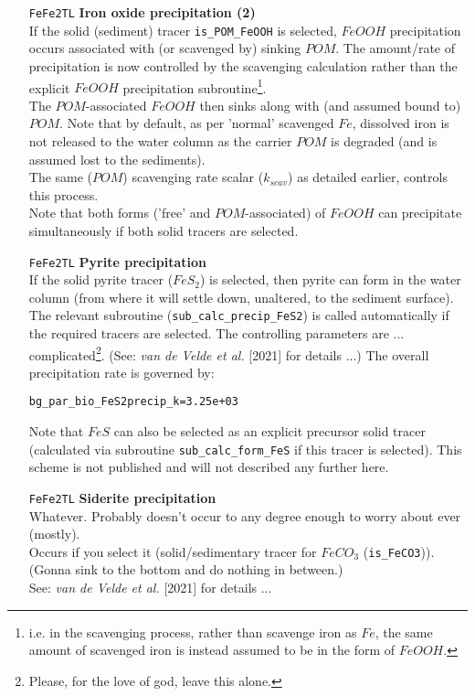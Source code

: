 \begin{itemize}[noitemsep]
\vspace{1mm}
\item [\texttt{FeFe2TL}] \textbf{Iron oxide precipitation (2)}
\\If the solid (sediment) tracer \texttt{is\_POM\_FeOOH} is selected,  \(FeOOH\) precipitation occurs associated with (or scavenged by) sinking \(POM\). The amount/rate of precipitation is  now controlled by the scavenging calculation rather than the explicit \(FeOOH\) precipitation subroutine\footnote{i.e. in the scavenging process, rather than scavenge iron as \(Fe\), the same amount of  scavenged iron is instead assumed to be in the form of \(FeOOH\).}.
\\The \(POM\)-associated \(FeOOH\) then sinks along with (and assumed bound to) \(POM\). Note that by default, as per 'normal' scavenged \(Fe\), dissolved iron is not released to the water column as the carrier \(POM\) is degraded (and is assumed lost to the sediments).
\\The same (\(POM\)) scavenging rate scalar (\(k_{scav}\)) as detailed earlier, controls this process. 
\\Note that both forms ('free' and \(POM\)-associated) of \(FeOOH\) can precipitate simultaneously if both solid tracers are selected.

\vspace{1mm}
\item [\texttt{FeFe2TL}] \textbf{Pyrite precipitation}
\\If the solid pyrite tracer (\(FeS_{2}\)) is selected, then pyrite can form in the water column (from where it will settle down, unaltered, to the sediment surface).
\\The relevant subroutine (\texttt{sub\_calc\_precip\_FeS2}) is called automatically if the required tracers are selected. The controlling parameters are ... complicated\footnote{Please, for the love of god, leave this alone.}. (See: \textit{van de Velde et al.} [2021] for details ...) The overall precipitation rate is governed by:
\vspace{-1mm}\small\begin{verbatim}
bg_par_bio_FeS2precip_k=3.25e+03
\end{verbatim}\normalsize\vspace{-1mm}
Note that \(FeS\) can also be selected as an explicit precursor solid tracer (calculated via subroutine \texttt{sub\_calc\_form\_FeS} if this tracer is selected). This scheme is not published and will not described any further here.

\vspace{1mm}
\item [\texttt{FeFe2TL}] \textbf{Siderite precipitation}
\\Whatever. Probably doesn't occur to any degree enough to worry about ever (mostly).
\\Occurs if you select it (solid/sedimentary tracer  for \(FeCO_{3}\) (\texttt{is\_FeCO3})).
\\(Gonna sink to the bottom and do nothing in between.)
\\See: \textit{van de Velde et al.} [2021] for details ...


\end{itemize}

